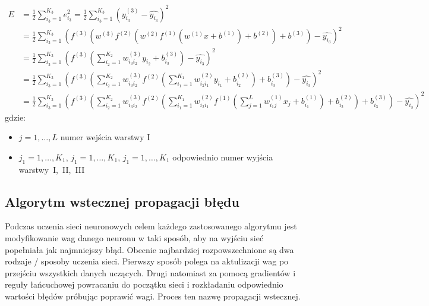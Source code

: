 \documentclass[12pt,twoside]{article}
\begin{document}
\begin{equation}
	\begin{aligned}
		E &= \frac{1}{2} \sum_{i_3=1}^{K_3}e_{i_3}^2
		= \frac{1}{2} \sum_{i_3=1}^{K_3}(y_{i_3}^{(3)} - \hat{y_{i_3}})^2\\
		&= \frac{1}{2} \sum_{i_3=1}^{K_3}(f^{(3)}(w^{(3)}f^{(2)}(w^{(2)}f^{(1)}(w^{(1)}x+b^{(1)})+b^{(2)})+b^{(3)}) - \hat{y_{i_3}})^2\\
		&= \frac{1}{2}\sum_{i_3=1}^{K_3}(f^{(3)}(\sum_{i_2=1}^{K_2}w_{i_3i_2}^{(3)}y_{i_2}+b_{i_3}^{(3)}) - \hat{y_{i_3}})^2\\
		&= \frac{1}{2}\sum_{i_3=1}^{K_3}(
		f^{(3)}(\sum_{i_2=1}^{K_2}w_{i_3i_2}^{(3)}f^{(2)}(
		\sum_{i_1=1}^{K_1}w_{i_2i_1}^{(2)}y_{i_1}+b_{i_2}^{(2)}
		)+b_{i_3}^{(3)}) - \hat{y_{i_3}})^2\\
		&= \frac{1}{2}\sum_{i_3=1}^{K_3}(
		f^{(3)}(\sum_{i_2=1}^{K_2}w_{i_3i_2}^{(3)}f^{(2)}(
		\sum_{i_1=1}^{K_1}w_{i_2i_1}^{(2)}
		f^{(1)}(\sum_{j=1}^{L}w_{i_1j}^{(1)}x_j+b_{i_1}^{(1)})
		+b_{i_2}^{(2)}
		)+b_{i_3}^{(3)})
		- \hat{y_{i_3}})^2
	\end{aligned}
	\label{Eq:funkcja_celu}
\end{equation}
gdzie:
\begin{itemize}
	\setlength\itemsep{0em}
	\setlength{\parskip}{0pt}
	\item $j = 1,\dots,L$ numer wejścia warstwy I
	\item $j_1=1,\dots,K_1$, $j_1=1,\dots,K_1$, $j_1=1,\dots,K_1$ odpowiednio numer wyjścia warstwy~I,~II,~III
\end{itemize}
\newpage

\subsection{Algorytm wstecznej propagacji błędu}
Podczas uczenia sieci neuronowych celem każdego zastosowanego algorytmu jest modyfikowanie wag danego neuronu w taki sposób, aby na wyjściu sieć popełniała jak najmniejszy błąd. Obecnie najbardziej rozpowszechnione są dwa rodzaje / sposoby uczenia sieci. Pierwszy sposób polega na aktulizacji wag po przejściu wszystkich danych uczących. Drugi natomiast za pomocą gradientów i reguły łańcuchowej
powracaniu do początku sieci i rozkładaniu odpowiednio wartości błędów próbując poprawić wagi. Proces ten nazwę propagacji wstecznej.
\end{document}
